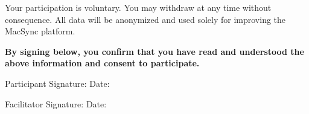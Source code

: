 \documentclass[12pt, titlepage]{article}
\begin{document}
\vspace{0.5em}
\noindent Your participation is voluntary. You may withdraw at any time without consequence. All data will be anonymized and used solely for improving the MacSync platform.


\vspace{1em}
\noindent\textbf{By signing below, you confirm that you have read and understood the above information and consent to participate.}


\vspace{2em}
\noindent Participant Signature: \underline{\hspace{6cm}} \quad Date: \underline{\hspace{3cm}}


\vspace{1em}
\noindent Facilitator Signature: \underline{\hspace{6cm}} \quad Date: \underline{\hspace{3cm}}
\end{document}
